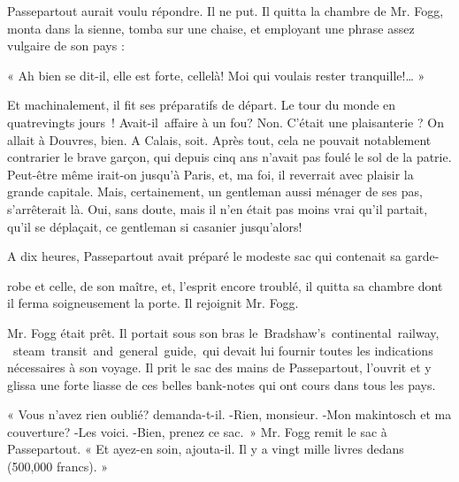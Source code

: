 \documentclass[]{book}
\begin{document}
               Passepartout aurait voulu répondre. Il
               ne put. Il quitta la chambre de Mr. Fogg,
               monta dans la sienne, tomba sur une 
               chaise, et employant une phrase assez 
               vulgaire de son pays :
            
               « Ah bien se dit-il, elle est forte, cellelà! Moi qui voulais rester tranquille!… »\newline
            
               Et machinalement, il fit ses préparatifs 
               de départ. Le tour du monde en quatrevingts jours ! Avait-il affaire à un fou? 
               Non. C'était une plaisanterie ? On allait à
               Douvres, bien. A Calais, soit. Après tout, 
               cela ne pouvait notablement contrarier le
               brave garçon, qui depuis cinq ans n'avait 
               pas foulé le sol de la patrie. Peut-être même irait-on jusqu'à Paris, et, ma foi, il 
               reverrait avec plaisir la grande capitale.
               Mais, certainement, un gentleman aussi 
               ménager de ses pas, s'arrêterait là. Oui,
               sans doute, mais il n'en était pas moins
               vrai qu'il partait, qu'il se déplaçait, ce
               gentleman si casanier jusqu'alors!
            
               A dix heures, Passepartout avait préparé le modeste sac qui contenait sa garde- 
            
               robe et celle, de son maître, et, l'esprit
               encore troublé, il quitta sa chambre dont 
               il ferma soigneusement la porte. Il rejoignit Mr. Fogg.
            
               Mr. Fogg était prêt. Il portait sous son 
               bras le Bradshaw's continental railway,
                steam transit and general guide, qui devait 
               lui fournir toutes les indications nécessaires à son voyage. Il prit le sac des 
               mains de Passepartout, l'ouvrit et y glissa
               une forte liasse de ces belles bank-notes 
               qui ont cours dans tous les pays.
            
               « Vous n'avez rien oublié? demanda-t-il.\newline
               -Rien, monsieur.\newline
               -Mon makintosch et ma couverture?\newline
               -Les voici.\newline
               -Bien, prenez ce sac. »
               Mr. Fogg remit le sac à Passepartout.\newline
               « Et ayez-en soin, ajouta-il. Il y a vingt
               mille livres dedans (500,000 francs). »\newline 
            
\end{document}
